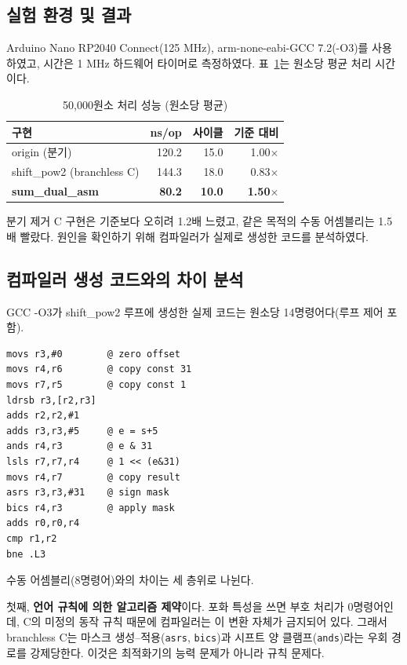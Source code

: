 \subsection{실험 환경 및 결과}

Arduino Nano RP2040 Connect(125 MHz), arm-none-eabi-GCC 7.2(-O3)를 사용하였고, 시간은
1 MHz 하드웨어 타이머로 측정하였다. 표~\ref{tab:result}는 원소당 평균 처리 시간이다.

\begin{table}[t]
\centering
\caption{50,000원소 처리 성능 (원소당 평균)}
\label{tab:result}
\small
\begin{tabular}{lrrr}
\toprule
구현 & ns/op & 사이클 & 기준 대비 \\
\midrule
origin (분기) & 120.2 & 15.0 & 1.00$\times$ \\
shift\_pow2 (branchless C) & 144.3 & 18.0 & 0.83$\times$ \\
\textbf{sum\_dual\_asm} & \textbf{80.2} & \textbf{10.0} & \textbf{1.50$\times$} \\
\bottomrule
\end{tabular}
\end{table}

분기 제거 C 구현은 기준보다 오히려 1.2배 느렸고, 같은 목적의 수동 어셈블리는 1.5배
빨랐다. 원인을 확인하기 위해 컴파일러가 실제로 생성한 코드를 분석하였다.

\subsection{컴파일러 생성 코드와의 차이 분석}

GCC -O3가 shift\_pow2 루프에 생성한 실제 코드는 원소당 14명령어다(루프 제어 포함).

\begin{lstlisting}
movs r3,#0        @ zero offset
movs r4,r6        @ copy const 31
movs r7,r5        @ copy const 1
ldrsb r3,[r2,r3]
adds r2,r2,#1
adds r3,r3,#5     @ e = s+5
ands r4,r3        @ e & 31
lsls r7,r7,r4     @ 1 << (e&31)
movs r4,r7        @ copy result
asrs r3,r3,#31    @ sign mask
bics r4,r3        @ apply mask
adds r0,r0,r4
cmp r1,r2
bne .L3
\end{lstlisting}

수동 어셈블리(8명령어)와의 차이는 세 층위로 나뉜다.

첫째, \textbf{언어 규칙에 의한 알고리즘 제약}이다. 포화 특성을 쓰면 부호 처리가 0명령어인데,
C의 미정의 동작 규칙 때문에 컴파일러는 이 변환 자체가 금지되어 있다. 그래서 branchless C는
마스크 생성--적용(\texttt{asrs}, \texttt{bics})과 시프트 양 클램프(\texttt{ands})라는 우회
경로를 강제당한다. 이것은 최적화기의 능력 문제가 아니라 규칙 문제다.

